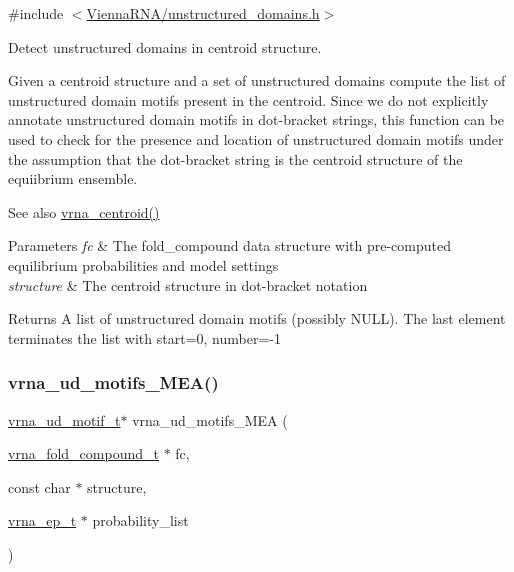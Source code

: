 {\ttfamily \#include $<$\hyperlink{unstructured__domains_8h}{Vienna\+R\+N\+A/unstructured\+\_\+domains.\+h}$>$}



Detect unstructured domains in centroid structure. 

Given a centroid structure and a set of unstructured domains compute the list of unstructured domain motifs present in the centroid. Since we do not explicitly annotate unstructured domain motifs in dot-\/bracket strings, this function can be used to check for the presence and location of unstructured domain motifs under the assumption that the dot-\/bracket string is the centroid structure of the equiibrium ensemble.

\begin{DoxySeeAlso}{See also}
\hyperlink{group__centroid__fold_ga0e64bb67e51963dc71cbd4d30b80a018}{vrna\+\_\+centroid()}
\end{DoxySeeAlso}

\begin{DoxyParams}{Parameters}
{\em fc} & The fold\+\_\+compound data structure with pre-\/computed equilibrium probabilities and model settings \\
\hline
{\em structure} & The centroid structure in dot-\/bracket notation \\
\hline
\end{DoxyParams}
\begin{DoxyReturn}{Returns}
A list of unstructured domain motifs (possibly N\+U\+LL). The last element terminates the list with {\ttfamily start=0}, {\ttfamily number=-\/1} 
\end{DoxyReturn}
\mbox{\label{group__domains__up_ga980126e9f350b64474b35f20fce2782c}} 
\subsubsection{\texorpdfstring{vrna\+\_\+ud\+\_\+motifs\+\_\+\+M\+E\+A()}{vrna\_ud\_motifs\_MEA()}}
{\footnotesize\ttfamily \hyperlink{structvrna__unstructured__domain__motif__s}{vrna\+\_\+ud\+\_\+motif\+\_\+t}$\ast$ vrna\+\_\+ud\+\_\+motifs\+\_\+\+M\+EA (\begin{DoxyParamCaption}\item[{\hyperlink{group__fold__compound_ga1b0cef17fd40466cef5968eaeeff6166}{vrna\+\_\+fold\+\_\+compound\+\_\+t} $\ast$}]{fc,  }\item[{const char $\ast$}]{structure,  }\item[{\hyperlink{group__struct__utils__plist_gab9ac98ab55ded9fb90043b024b915aca}{vrna\+\_\+ep\+\_\+t} $\ast$}]{probability\+\_\+list }\end{DoxyParamCaption})}



